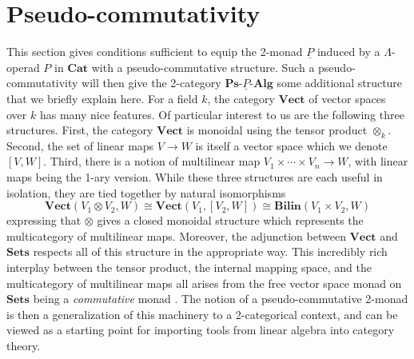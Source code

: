 \documentclass{amsbook} %
\newcommand{\mb}{\mathbf}
\numberwithin{section}{chapter}
\begin{document}
\section{Pseudo-commutativity}

This section gives conditions sufficient to equip the 2-monad $\underline{P}$ induced by a $\Lambda$-operad $P$ in $\mb{Cat}$ with a pseudo-commutative structure.  Such a pseudo-commutativity will then give the 2-category $\mb{Ps}\mbox{-}\underline{P}\mbox{-}\mb{Alg}$ some additional structure that we briefly explain here.  For a field $k$, the category $\mb{Vect}$ of vector spaces over $k$ has many nice features.  Of particular interest to us are the following three structures.  First, the category $\mb{Vect}$ is monoidal using the tensor product $\otimes_{k}$.  Second, the set of linear maps $V \rightarrow W$ is itself a vector space which we denote $[V,W]$.  Third, there is a notion of multilinear map $V_{1} \times \cdots \times V_{n} \rightarrow W$, with linear maps being the 1-ary version.  While these three structures are each useful in isolation, they are tied together by natural isomorphisms
\[
\mb{Vect}(V_{1} \otimes V_{2}, W) \cong \mb{Vect}(V_{1}, [V_{2}, W]) \cong \mb{Bilin}(V_{1} \times V_{2}, W)
\]
expressing that $\otimes$ gives a closed monoidal structure which represents the multicategory of multilinear maps.  Moreover, the adjunction between $\mb{Vect}$ and $\mb{Sets}$ respects all of this structure in the appropriate way.  This incredibly rich interplay between the tensor product, the internal mapping space, and the multicategory of multilinear maps all arises from the free vector space monad on $\mb{Sets}$ being a \textit{commutative} monad \cite{kock-monads, kock-closed, kock-strong}.  The notion of a pseudo-commutative 2-monad \cite{HP} is then a generalization of this machinery to a 2-categorical context, and can be viewed as a starting point for importing tools from linear algebra into category theory.
\end{document}
